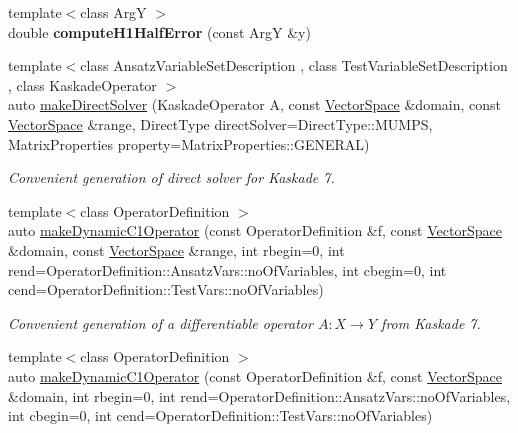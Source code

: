 \begin{DoxyCompactItemize}
\item 
\hypertarget{namespaceSpacy_1_1Kaskade_a5feca47bd92b04a1a9193cd15c9babcf}{}{\footnotesize template$<$class Arg\+Y $>$ }\\double {\bfseries compute\+H1\+Half\+Error} (const Arg\+Y \&y)\label{namespaceSpacy_1_1Kaskade_a5feca47bd92b04a1a9193cd15c9babcf}

\item 
{\footnotesize template$<$class Ansatz\+Variable\+Set\+Description , class Test\+Variable\+Set\+Description , class Kaskade\+Operator $>$ }\\auto \hyperlink{namespaceSpacy_1_1Kaskade_a9ee22f7d702c4cfc68786dd821dddd56_a9ee22f7d702c4cfc68786dd821dddd56}{make\+Direct\+Solver} (Kaskade\+Operator A, const \hyperlink{classSpacy_1_1VectorSpace}{Vector\+Space} \&domain, const \hyperlink{classSpacy_1_1VectorSpace}{Vector\+Space} \&range, Direct\+Type direct\+Solver=Direct\+Type\+::\+M\+U\+M\+P\+S, Matrix\+Properties property=Matrix\+Properties\+::\+G\+E\+N\+E\+R\+A\+L)
\begin{DoxyCompactList}\small\item\em Convenient generation of direct solver for Kaskade 7. \end{DoxyCompactList}\item 
{\footnotesize template$<$class Operator\+Definition $>$ }\\auto \hyperlink{group__KaskadeGroup_gac4502ad2f54b2c7d82e2a5d5790dc8b6_gac4502ad2f54b2c7d82e2a5d5790dc8b6}{make\+Dynamic\+C1\+Operator} (const Operator\+Definition \&f, const \hyperlink{classSpacy_1_1VectorSpace}{Vector\+Space} \&domain, const \hyperlink{classSpacy_1_1VectorSpace}{Vector\+Space} \&range, int rbegin=0, int rend=Operator\+Definition\+::\+Ansatz\+Vars\+::no\+Of\+Variables, int cbegin=0, int cend=Operator\+Definition\+::\+Test\+Vars\+::no\+Of\+Variables)
\begin{DoxyCompactList}\small\item\em Convenient generation of a differentiable operator $A: X\rightarrow Y$ from Kaskade 7. \end{DoxyCompactList}\item 
{\footnotesize template$<$class Operator\+Definition $>$ }\\auto \hyperlink{group__KaskadeGroup_gacb385469fa2c1465b9ed8cbe6fabc13c_gacb385469fa2c1465b9ed8cbe6fabc13c}{make\+Dynamic\+C1\+Operator} (const Operator\+Definition \&f, const \hyperlink{classSpacy_1_1VectorSpace}{Vector\+Space} \&domain, int rbegin=0, int rend=Operator\+Definition\+::\+Ansatz\+Vars\+::no\+Of\+Variables, int cbegin=0, int cend=Operator\+Definition\+::\+Test\+Vars\+::no\+Of\+Variables)

\end{DoxyCompactItemize}

